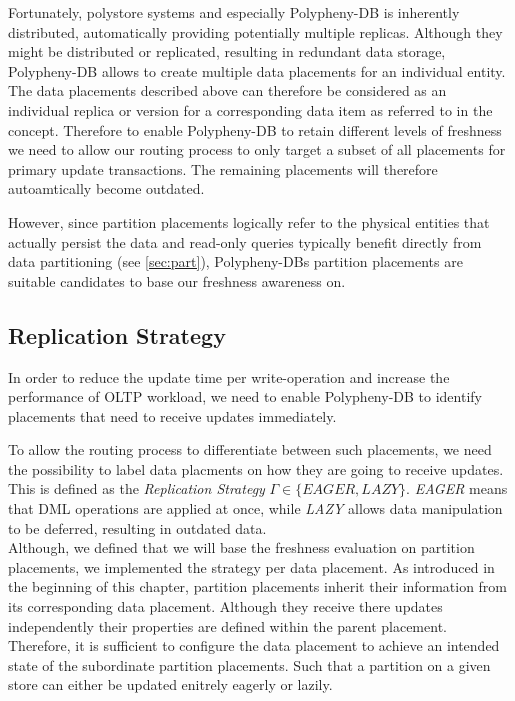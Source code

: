 Fortunately, polystore systems and especially Polypheny-DB is inherently distributed, automatically providing potentially multiple replicas.
Although they might be distributed or replicated, resulting in redundant data storage, Polypheny-DB allows to create multiple data placements for an individual entity. 
The data placements described above can therefore be considered as an individual replica or version for a corresponding data item as referred to in the concept.
Therefore to enable Polypheny-DB to retain different levels of freshness we need to allow our routing process
to only target a subset of all placements for primary update transactions. The remaining placements will therefore autoamtically become outdated. 

However, since partition placements logically refer to the physical entities that actually persist the data and 
read-only queries typically benefit directly from data partitioning (see \ref{sec:part}), Polypheny-DBs partition placements 
are suitable candidates to base our freshness awareness on.





\subsection{Replication Strategy}
\label{sec:strategy}

In order to reduce the update time per write-operation and increase the performance
of OLTP workload, we need to enable Polypheny-DB to identify placements that need to receive updates immediately. 

To allow the routing process to differentiate between such placements,
we need the possibility to label data placments on how they are going to receive updates. This is defined as the \emph{Replication Strategy} $\Gamma \in \{EAGER,LAZY\}$.
\emph{EAGER} means that DML operations are applied at once, while \emph{LAZY}
allows data manipulation to be deferred, resulting in outdated data.\\


Although, we defined that we will base the freshness evaluation on partition placements, we implemented the strategy per data placement. 
As introduced in the beginning of this chapter, partition placements inherit their information from its corresponding data placement.
Although they receive there updates independently their properties are defined within the parent placement. 
Therefore, it is sufficient to configure the data placement to achieve an intended state of the subordinate partition placements.
Such that a partition on a given store can either be updated enitrely eagerly or lazily. 

